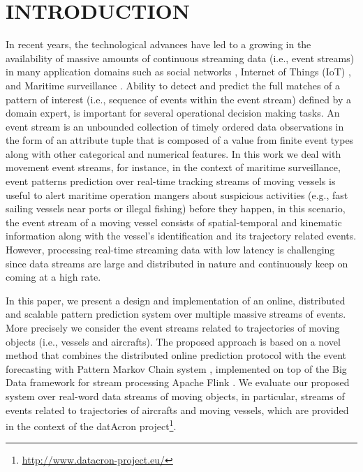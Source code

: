 \section{INTRODUCTION}


In recent years, the technological advances have led to a growing in the availability of massive amounts of continuous streaming data (i.e., event streams) in many application domains such as social networks \cite{mathioudakis2010twittermonitor}, Internet of Things (IoT) \cite{miorandi2012internet}, and Maritime surveillance \cite{patroumpas2015event}. Ability to detect and predict the full matches of a pattern of interest (i.e., sequence of events within the event stream) defined by a domain expert, is important for several operational decision making tasks.
An event stream is an unbounded collection of timely ordered data observations in the form of an attribute tuple that is composed of a value from finite event types along with other categorical and numerical features. In this work we deal with movement event streams, for instance, in the context of maritime surveillance, event patterns prediction over real-time tracking streams of moving vessels is useful to alert maritime operation mangers about suspicious activities (e.g., fast sailing vessels near ports or illegal fishing) before they happen, in this scenario, the event stream of a moving vessel consists of spatial-temporal and kinematic information along with the vessel's identification and its trajectory related events. However, processing real-time streaming data with low latency is challenging since data streams are large and distributed in nature and continuously keep on coming at a high rate. 
\par In this paper, we present a design and implementation of an online, distributed and scalable pattern prediction system over multiple massive streams of events. More precisely we consider the event streams related to trajectories of moving objects (i.e., vessels and aircrafts). The proposed approach is based on a novel method that combines the distributed online prediction protocol \cite{dekel2012optimal,kamp2014communication} with the event forecasting with Pattern Markov Chain system \cite{alevizos2017event}, implemented on top of the Big Data framework for stream processing Apache Flink \cite{Flink}. We evaluate our proposed system over  real-word data streams of moving objects, in particular, streams of events related to trajectories of aircrafts and moving vessels, which are provided in the context of the datAcron project\footnote{\url{http://www.datacron-project.eu/}}.

